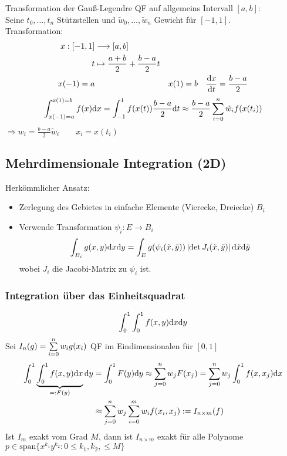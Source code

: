 Transformation der Gauß-Legendre QF auf allgemeins Intervall $[a,b]$:\\
Seine $t_0,\ldots,t_n$ Stützstellen und $\tilde{w}_0,\ldots,\tilde{w}_n$ Gewicht für $[-1,1]$.\\
Transformation: 
\begin{align*}
  x:[-1,1] &\longrightarrow [a,b]\\
  t &\mapsto \frac{a+b}{2} + \frac{b-a}{2} t\\
  x(-1) = a && x(1) = b && \frac{\mathrm{d}x}{\mathrm{d}t} = \frac{b-a}{2} 
\end{align*}
\begin{align*}
  \int_{x(-1)=a}^{x(1)=b} f(x) \mathrm{d}x = \int_{-1}^1 f(x(t)) \frac{b-a}{2} \mathrm{d}t \approx
    \frac{b-a}{2} \sum\limits_{i=0}^{n}{\tilde{w}_i f(x(t_i))}
\end{align*}
$\Rightarrow w_i = \frac{b-a}{2} \tilde{w}_i \qquad x_i = x(t_i)$

\subsection{Mehrdimensionale Integration (2D)}
Herkömmlicher Ansatz:
\begin{itemize}
  \item Zerlegung des Gebietes in einfache Elemente (Vierecke, Dreiecke) $B_i$
  \item Verwende Transformation $\psi_i: E \longrightarrow B_i$\begin{align*}
      \int_{B_i} g(x,y) \mathrm{d}x\mathrm{d}y = \int_E g(\psi_i(\tilde{x},\tilde{y})) \left| \det J_i(\tilde{x},\tilde{y}) \right| \mathrm{d}\tilde{x}\mathrm{d}\tilde{y}
  \end{align*} wobei $J_i$ die Jacobi-Matrix zu $\psi_i$ ist.
\end{itemize}
\subsubsection{Integration über das Einheitsquadrat}
\begin{align*}
  \int_0^1 \int_0^1 f(x,y) \mathrm{d}x\mathrm{d}y
\end{align*}
Sei $I_n(g) = \sum\limits_{i=0}^{n}{w_i g(x_i)}$ QF im Eindimensionalen für $[0,1]$
\begin{align*}
  \int_0^1 \underbrace{\int_0^1 f(x,y) \mathrm{d}x}_{=:F(y)} \mathrm{d}y &= \int_0^1 F(y) \mathrm{d}y \approx \sum\limits_{j=0}^{n}{w_j F(x_j)} = \sum\limits_{j=0}^{n}{w_j \int_0^1 f(x, x_j) \mathrm{d}x}\\
    &\approx \sum\limits_{j=0}^{n}{w_j \sum_{i=0}^m w_i f(x_i, x_j) } := I_{n \times m}(f)
\end{align*}
Ist $I_m$ exakt vom Grad $M$, dann ist $I_{n \times m}$ exakt für alle Polynome\\
$p \in \mathrm{span} \{x^{k_1}y^{k_2}: 0 \leq k_1, k_2, \leq M\}$
